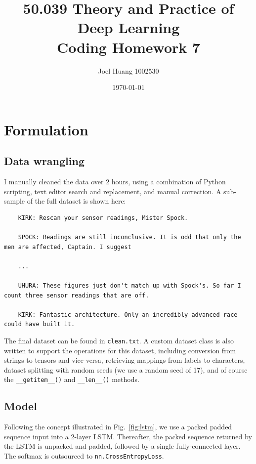 \documentclass[twocolumn, 9pt]{article}
\title{
	50.039 Theory and Practice of Deep Learning\\
	Coding Homework 7
}
\author{Joel Huang 1002530}
\date{\today}
\begin{document}
\maketitle

\section{Formulation}
\subsection*{Data wrangling}
I manually cleaned the data over 2 hours, using a combination of Python scripting, text editor search and
replacement, and manual correction. A sub-sample of the full dataset is shown here:
\begin{lstlisting}
    KIRK: Rescan your sensor readings, Mister Spock.

    SPOCK: Readings are still inconclusive. It is odd that only the men are affected, Captain. I suggest

    ...

    UHURA: These figures just don't match up with Spock's. So far I count three sensor readings that are off.

    KIRK: Fantastic architecture. Only an incredibly advanced race could have built it.
\end{lstlisting}
The final dataset can be found in \lstinline{clean.txt}. 
A custom dataset class is also written to support the operations for this dataset, including conversion from
strings to tensors and vice-versa, retrieving mappings from labels to characters, dataset splitting with random
seeds (we use a random seed of 17), and of course the \lstinline{__getitem__()} and \lstinline{__len__()} methods.

\subsection*{Model}
Following the concept illustrated in Fig.~\ref{fig:lstm}, we use a packed padded sequence input into a
2-layer LSTM. Thereafter, the packed sequence returned by the LSTM is unpacked and padded,
followed by a single fully-connected layer. The softmax is outsourced to \lstinline{nn.CrossEntropyLoss}.
\end{document}
